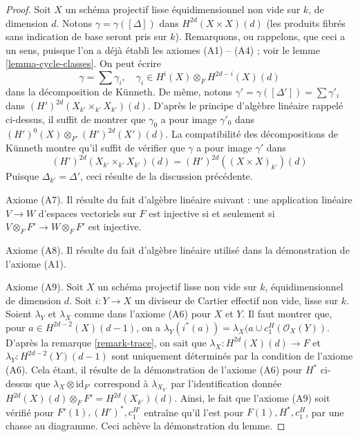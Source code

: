 \begin{proof}
\medskip\noindent
Soit $X$ un schéma projectif lisse équidimensionnel non vide
sur $k$, de dimension $d$. Notons $\gamma = \gamma([\Delta])$
dans $H^{2d}(X \times X)(d)$ (les produits fibrés sans indication de base seront pris sur $k$).
Remarquons, ou rappelons, que ceci a un sens, puisque l'on a déjà établi les axiomes (A1) -- (A4) ;
voir le lemme \ref{lemma-cycle-classes}. On peut écrire
$$
\gamma = \sum \gamma_i, \quad
\gamma_i \in H^i(X) \otimes_F H^{2d - i}(X)(d)
$$
dans la décomposition de K\"unneth. De même, notons
$\gamma' = \gamma([\Delta']) = \sum \gamma'_i$
dans $(H')^{2d}(X_{k'} \times_{k'} X_{k'})(d)$.
D'après le principe d'algèbre linéaire rappelé ci-dessus, il suffit
de montrer que $\gamma_0$ a pour image $\gamma'_0$ dans
$(H')^0(X) \otimes_{F'} (H')^{2d}(X')(d)$.
La compatibilité des décompositions de K\"unneth
montre qu'il suffit de vérifier que $\gamma$ a pour image
$\gamma'$ dans
$$
(H')^{2d}(X_{k'} \times_{k'} X_{k'})(d) = (H')^{2d}((X \times X)_{k'})(d)
$$
Puisque $\Delta_{k'} = \Delta'$, ceci résulte de la discussion précédente.

\medskip\noindent
Axiome (A7). Il résulte du fait d'algèbre linéaire suivant : une
application linéaire $V \to W$ d'espaces vectoriels sur $F$ est injective
si et seulement si $V \otimes_F F' \to W \otimes_F F'$ est injective.

\medskip\noindent
Axiome (A8). Il résulte du fait d'algèbre linéaire utilisé dans
la démonstration de l'axiome (A1).

\medskip\noindent
Axiome (A9). Soit $X$ un schéma projectif lisse non vide sur $k$,
équidimensionnel de dimension $d$. Soit $i : Y \to X$ un diviseur de Cartier
effectif non vide, lisse sur $k$.
Soient $\lambda_Y$ et $\lambda_X$ comme dans l'axiome (A6) pour $X$ et $Y$.
Il faut montrer que, pour $a \in H^{2d - 2}(X)(d - 1)$,
on a $\lambda_Y(i^*(a)) = \lambda_X(a \cup c_1^H(\mathcal{O}_X(Y))$.
D'après la remarque \ref{remark-trace},
on sait que $\lambda_X : H^{2d}(X)(d) \to F$ et
$\lambda_Y : H^{2d - 2}(Y)(d - 1)$ sont uniquement
déterminés par la condition de l'axiome (A6).
Cela étant, il résulte de la démonstration de l'axiome (A6) pour $H^*$ ci-dessus
que $\lambda_X \otimes \text{id}_{F'}$ correspond à $\lambda_{X_{k'}}$
par l'identification donnée $H^{2d}(X)(d) \otimes_F F' = H^{2d}(X_{k'})(d)$.
Ainsi, le fait que l'axiome (A9) soit vérifié pour $F'(1), (H')^*, c_1^{H'}$
entraîne qu'il l'est pour $F(1), H^*, c_1^H$, par une chasse au diagramme.
Ceci achève la démonstration du lemme.
\end{proof}






















